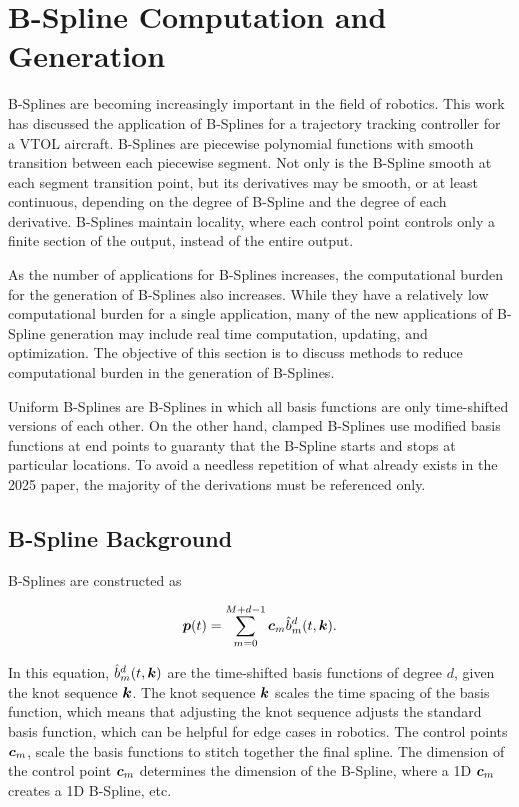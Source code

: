 \chapter{B-Spline Computation and Generation}
\label{ch:BSplines}

B-Splines are becoming increasingly important in the field of robotics. 
This work has discussed the application of B-Splines for a trajectory tracking controller for a VTOL aircraft. 
B-Splines are piecewise polynomial functions with smooth transition between each piecewise segment.
Not only is the B-Spline smooth at each segment transition point, but its derivatives may be smooth, or at least continuous, depending on the degree of B-Spline and the degree of each derivative.
B-Splines maintain locality, where each control point controls only a finite section of the output, instead of the entire output. 

As the number of applications for B-Splines increases, the computational burden for the generation of B-Splines also increases. 
While they have a relatively low computational burden for a single application, many of the new applications of B-Spline generation may include real time computation, updating, and optimization.
The objective of this section is to discuss methods to reduce computational burden in the generation of B-Splines.

Uniform B-Splines are B-Splines in which all basis functions are only time-shifted versions of each other.
On the other hand, clamped B-Splines use modified basis functions at end points to guaranty that the B-Spline starts and stops at particular locations.
To avoid a needless repetition of what already exists in the 2025 paper, the majority of the derivations must be referenced only. 

\section{B-Spline Background}

B-Splines are constructed as

\begin{align}
    \boldsymbol{p}(t) = \sum_{m=0}^{M+d-1} \boldsymbol{c}_m \hat{b}_m^d(t, \boldsymbol{k}).
\end{align}

In this equation, $\hat{b}_m^d(t, \boldsymbol{k})$ are the time-shifted basis functions of degree $d$, given the knot sequence $\boldsymbol{k}$. 
The knot sequence $\boldsymbol{k}$ scales the time spacing of the basis function, which means that adjusting the knot sequence adjusts the standard basis function, which can be helpful for edge cases in robotics. 
The control points $\boldsymbol{c}_m$, scale the basis functions to stitch together the final spline. 
The dimension of the control point $\boldsymbol{c}_m$ determines the dimension of the B-Spline, where a 1D $\boldsymbol{c}_m$ creates a 1D B-Spline, etc.

